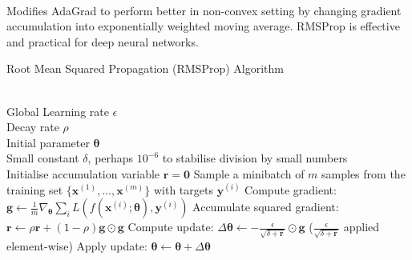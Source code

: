 \begin{remark} \\
Modifies AdaGrad to perform better in non-convex setting by changing gradient accumulation into exponentially weighted moving average. RMSProp is effective and practical for deep neural networks.
\end{remark}

\begin{breakablealgorithm}
\caption{Root Mean Squared Propagation (RMSProp) Algorithm}
\begin{algorithmic}
\Require \\
Global Learning rate $\epsilon$\\
Decay rate $\rho$\\
Initial parameter $\bm{\theta}$\\
Small constant $\delta$, perhaps $10^{-6}$ to stabilise division by small numbers\\

\State Initialise accumulation variable $\bm{r} = \bm{0}$
\State Sample a minibatch of $m$ samples from the training set $\{\bm{x}^{(1)}, \ldots, \bm{x}^{(m)} \}$ with targets $\bm{y}^{(i)}$
\State Compute gradient: $\bm{g} \leftarrow \frac{1}{m} \nabla_{\bm{\theta}} \sum_i L(f(\bm{x}^{(i)}; \bm{\theta}), \bm{y}^{(i)})$
\State Accumulate squared gradient: $\bm{r} \leftarrow \rho \bm{r} + (1 - \rho) \bm{g} \odot \bm{g}$
\State Compute update: $\Delta \bm{\theta} \leftarrow - \frac{\epsilon}{\sqrt{\delta + \bm{r}}} \odot \bm{g}$ ($\frac{\epsilon}{\sqrt{\delta + \bm{r}}}$ applied element-wise)
\State Apply update: $\bm{\theta} \leftarrow \bm{\theta} + \Delta \bm{\theta}$
\EndWhile
\end{algorithmic}
\end{breakablealgorithm}

